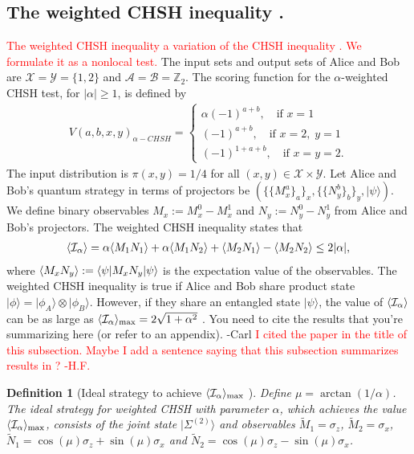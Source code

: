 \documentclass[11pt,letterpaper]{article}
\newcommand{\ket}[1]{|#1\rangle}
\newcommand{\bra}[1]{\langle#1|}
\newcommand{\x}{\otimes}
\DeclarePairedDelimiter{\ip}{\langle}{\rangle}
\newcommand{\Z}{\mathbb{Z}}
\newcommand{\calX}{\mathcal{X}}
\newcommand{\calY}{\mathcal{Y}}
\newcommand{\calA}{\mathcal{A}}
\newcommand{\calB}{\mathcal{B}}
\newcommand{\1}{\mathbb{1}}
\newcommand{\EPR}[1]{\Sigma^{(#1)}}
\newcommand{\paulix}{\sigma_x}
\newcommand{\pauliz}{\sigma_z}
\newcommand{\tM}{\tilde{M}}
\newcommand{\tN}{\tilde{N}}
\newcommand{\I}{\mathcal{I}}
\def\carl#1{{\color{blue} #1 -Carl}}
\newcommand{\hf}[1]{\textcolor{red}{#1}}
\newcommand{\hfc}[1]{\textcolor{red}{#1 -H.F.}}
\newtheorem{definition}[theorem]{Definition}
\theoremstyle{definition}
\begin{document}
\subsection{The weighted CHSH inequality \cite{acin2012}.}
\hf{The weighted CHSH inequality a variation of the CHSH inequality \cite{chsh}. 
We formulate it as a nonlocal test.}
The input sets and output sets of Alice and Bob are
$\calX = \calY = \{1, 2\}$ and $\calA = \calB = \Z_2$.
The scoring function for the $\alpha$-weighted CHSH test, for $|\alpha|\geq 1$,  is defined by
\begin{align}
	V(a,b,x,y)_{\alpha-CHSH} = 
	\begin{cases}
		\alpha (-1)^{a + b}, \quad \text{if } x = 1 \\
		(-1)^{a + b}, \quad \text{if } x = 2,\; y =1 \\
		(-1)^{1 + a + b}, \quad \text{if } x = y =2.
	\end{cases}
\end{align}
The input distribution is $\pi(x,y) = 1/4$ for all $(x,y) \in \calX \times \calY$.
Let Alice and Bob's quantum strategy in terms of projectors be $( \{\{M_x^a\}_a\}_x, \{\{N_y^b\}_b\}_y, \ket{\psi})$. 
We define binary observables $M_x := M_x^0 - M_x^1$ and $N_y := N_y^0 - N_y^1$ from Alice and Bob's projectors.
The weighted CHSH inequality states that 
\begin{align}
	\label{eq:chsh_op}
	\ip{\I_\alpha} = \alpha\ip{M_1N_1}+\alpha\ip{M_1N_2} + \ip{M_2N_1} - \ip{M_2N_2}\leq 2|\alpha|,
\end{align}
where $\ip{M_xN_y} := \bra{\psi} M_xN _y \ket{\psi}$ is the expectation value of the observables. 
The weighted CHSH inequality is true 
if Alice and Bob share product state $\ket{\phi} = \ket{\phi_A} \x \ket{\phi_B}$.
However, if they share an entangled state $\ket{\psi}$, the value of $\ip{\I_\alpha}$ can be as large as
$ \ip{\I_\alpha}_{\max} = 2\sqrt{1+\alpha^2}$ \cite{acin2012}.
\carl{You need to cite the results that you're summarizing here (or refer to an appendix).}
\hfc{I cited the paper in the title of this subsection. Maybe I add a sentence saying that this subsection
summarizes results in \cite{acin2012}?}
\begin{definition}[Ideal strategy to achieve $\ip{\I_\alpha}_{\max}$ \cite{acin2012}]
	\label{def:ideal}
	Define $\mu = \arctan(1/\alpha)$.
	The ideal strategy for weighted CHSH with parameter $\alpha$, which achieves the value $\ip{\I_\alpha}_{\max}$, 
	consists of the joint state $\ket{\EPR{2}}$ and observables $\tM_1 = \pauliz$, $\tM_2 = \paulix$,
	$\tN_1 = \cos(\mu) \pauliz+ \sin(\mu) \paulix$ and $\tN_2 = \cos(\mu) \pauliz - \sin(\mu) \paulix$.
\end{definition}
\end{document}
